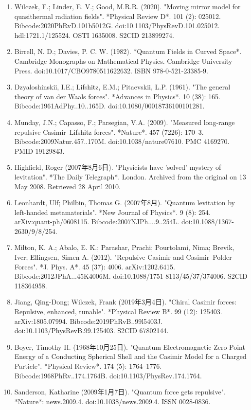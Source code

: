 \begin{enumerate}
\item Wilczek, F.; Linder, E. V.; Good, M.R.R. (2020). "Moving mirror model for quasithermal radiation fields". *Physical Review D*. 101 (2): 025012. Bibcode:2020PhRvD.101b5012G. doi:10.1103/PhysRevD.101.025012. hdl:1721.1/125524. OSTI 1635008. S2CID 213899274.
\item Birrell, N. D.; Davies, P. C. W. (1982). *Quantum Fields in Curved Space*. Cambridge Monographs on Mathematical Physics. Cambridge University Press. doi:10.1017/CBO9780511622632. ISBN 978-0-521-23385-9.
\item Dzyaloshinskii, I.E.; Lifshitz, E.M.; Pitaevskii, L.P. (1961). "The general theory of van der Waals forces". *Advances in Physics*. 10 (38): 165. Bibcode:1961AdPhy..10..165D. doi:10.1080/00018736100101281.
\item Munday, J.N.; Capasso, F.; Parsegian, V.A. (2009). "Measured long-range repulsive Casimir–Lifshitz forces". *Nature*. 457 (7226): 170–3. Bibcode:2009Natur.457..170M. doi:10.1038/nature07610. PMC 4169270. PMID 19129843.
\item Highfield, Roger (2007年8月6日). "Physicists have 'solved' mystery of levitation". *The Daily Telegraph*. London. Archived from the original on 13 May 2008. Retrieved 28 April 2010.
\item Leonhardt, Ulf; Philbin, Thomas G. (2007年8月). "Quantum levitation by left-handed metamaterials". *New Journal of Physics*. 9 (8): 254. arXiv:quant-ph/0608115. Bibcode:2007NJPh....9..254L. doi:10.1088/1367-2630/9/8/254.
\item Milton, K. A.; Abalo, E. K.; Parashar, Prachi; Pourtolami, Nima; Brevik, Iver; Ellingsen, Simen A. (2012). "Repulsive Casimir and Casimir–Polder Forces". *J. Phys. A*. 45 (37): 4006. arXiv:1202.6415. Bibcode:2012JPhA...45K4006M. doi:10.1088/1751-8113/45/37/374006. S2CID 118364958.
\item Jiang, Qing-Dong; Wilczek, Frank (2019年3月4日). "Chiral Casimir forces: Repulsive, enhanced, tunable". *Physical Review B*. 99 (12): 125403. arXiv:1805.07994. Bibcode:2019PhRvB..99l5403J. doi:10.1103/PhysRevB.99.125403. S2CID 67802144.
\item Boyer, Timothy H. (1968年10月25日). "Quantum Electromagnetic Zero-Point Energy of a Conducting Spherical Shell and the Casimir Model for a Charged Particle". *Physical Review*. 174 (5): 1764–1776. Bibcode:1968PhRv..174.1764B. doi:10.1103/PhysRev.174.1764.
\item Sanderson, Katharine (2009年1月7日). "Quantum force gets repulsive". *Nature*: news.2009.4. doi:10.1038/news.2009.4. ISSN 0028-0836.

\end{enumerate}
